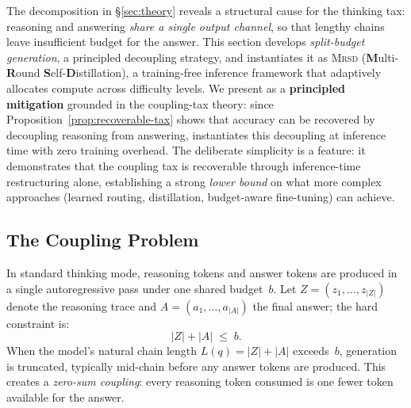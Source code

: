 
The decomposition in \S\ref{sec:theory} reveals a structural cause for the
thinking tax: reasoning and answering \emph{share a single output channel},
so that lengthy chains leave insufficient budget for the answer.
This section develops \emph{split-budget generation}, a principled
decoupling strategy, and instantiates it as
\textsc{Mrsd} (\textbf{M}ulti-\textbf{R}ound
\textbf{S}elf-\textbf{D}istillation), a training-free inference
framework that adaptively allocates compute across difficulty levels.
We present \method{} as a \textbf{principled mitigation} grounded in the
coupling-tax theory: since Proposition~\ref{prop:recoverable-tax} shows
that accuracy can be recovered by decoupling reasoning from answering,
\method{} instantiates this decoupling at inference time with zero
training overhead.
The deliberate simplicity is a feature: it demonstrates that the
coupling tax is recoverable through inference-time restructuring alone,
establishing a strong \emph{lower bound} on what more complex approaches
(learned routing, distillation, budget-aware fine-tuning) can achieve.

\subsection{The Coupling Problem}
\label{sec:method:coupling}

In standard thinking mode, reasoning tokens and answer tokens are
produced in a single autoregressive pass under one shared budget~$b$.
Let $Z = (z_1, \ldots, z_{|Z|})$ denote the reasoning trace and
$A = (a_1, \ldots, a_{|A|})$ the final answer; the hard constraint is:
\begin{equation}
  \label{eq:coupling-constraint}
  |Z| + |A| \;\le\; b.
\end{equation}
When the model's natural chain length $L(q) = |Z| + |A|$ exceeds~$b$,
generation is truncated, typically mid-chain before any answer tokens
are produced.
This creates a \emph{zero-sum coupling}: every reasoning token consumed
is one fewer token available for the answer.

